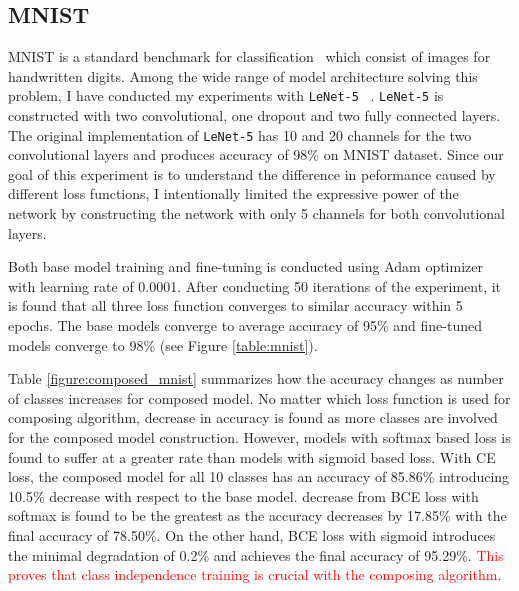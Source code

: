 \documentclass{article}
\newcommand{\red}[1]{\textcolor{red}{#1}}
\begin{document}
\subsection{MNIST}

MNIST is a standard benchmark for classification~\cite{lecun1998gradient} which consist of images for handwritten digits. Among the wide range of model architecture solving this problem, I have conducted my experiments with \texttt{LeNet-5} ~\cite{lecun2015lenet}. \texttt{LeNet-5} is constructed with two convolutional, one dropout and two fully connected layers. The original implementation of \texttt{LeNet-5} has 10 and 20 channels for the two convolutional layers and produces accuracy of 98\% on MNIST dataset. Since our goal of this experiment is to understand the difference in peformance caused by different loss functions, I intentionally limited the expressive power of the network by constructing the network with only 5 channels for both convolutional layers.

Both base model training and fine-tuning is conducted using Adam optimizer with learning rate of 0.0001. After conducting 50 iterations of the experiment, it is found that all three loss function converges to similar accuracy within 5 epochs. The base models converge to average accuracy of 95\% and fine-tuned models converge to 98\% (see Figure \ref{table:mnist}).

Table \ref{figure:composed_mnist} summarizes how the accuracy changes as number of classes increases for composed model. No matter which loss function is used for composing algorithm, decrease in accuracy is found as more classes are involved for the composed model construction. However, models with softmax based loss is found to suffer at a greater rate than models with sigmoid based loss. With CE loss, the composed model for all 10 classes has an accuracy of 85.86\% introducing 10.5\% decrease with respect to the base model. decrease from BCE loss with softmax is found to be the greatest as the accuracy decreases by 17.85\% with the final accuracy of 78.50\%. On the other hand, BCE loss with sigmoid introduces the minimal degradation of 0.2\% and achieves the final accuracy of 95.29\%. \red{This proves that class independence training is crucial with the composing algorithm.}
\end{document}
